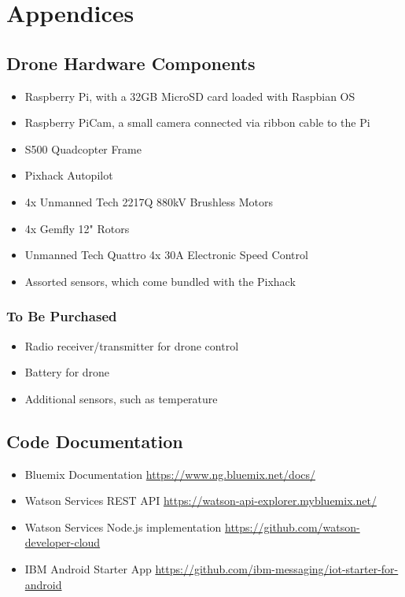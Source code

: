 \documentclass{article}
\begin{document}
\pagebreak
\section{Appendices}
\subsection{Drone Hardware Components}
\begin{itemize}
    \item Raspberry Pi, with a 32GB MicroSD card loaded with Raspbian OS
    \item Raspberry PiCam, a small camera connected via ribbon cable to the Pi
    \item S500 Quadcopter Frame
    \item Pixhack Autopilot
    \item 4x Unmanned Tech 2217Q 880kV Brushless Motors
    \item 4x Gemfly 12" Rotors
    \item Unmanned Tech Quattro 4x 30A Electronic Speed Control
    \item Assorted sensors, which come bundled with the Pixhack
\end{itemize}

\subsubsection{To Be Purchased}
\begin{itemize}
    \item Radio receiver/transmitter for drone control
    \item Battery for drone
    \item Additional sensors, such as temperature
\end{itemize}


\subsection{Code Documentation}
\begin{itemize}
    \item Bluemix Documentation \url{https://www.ng.bluemix.net/docs/}
    \item Watson Services REST API \url{https://watson-api-explorer.mybluemix.net/}
    \item Watson Services Node.js implementation \url{https://github.com/watson-developer-cloud}
    \item IBM Android Starter App \url{https://github.com/ibm-messaging/iot-starter-for-android}
\end{itemize}
\end{document}
